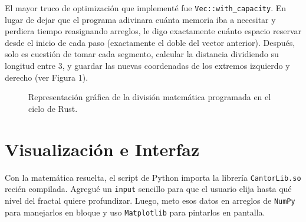 \documentclass[12pt,letterpaper]{article}
\begin{document}
El mayor truco de optimización que implementé fue \texttt{Vec::with\_capacity}. En lugar de dejar que el programa adivinara cuánta memoria iba a necesitar y perdiera tiempo reasignando arreglos, le digo exactamente cuánto espacio reservar desde el inicio de cada paso (exactamente el doble del vector anterior). Después, solo es cuestión de tomar cada segmento, calcular la distancia dividiendo su longitud entre 3, y guardar las nuevas coordenadas de los extremos izquierdo y derecho (ver Figura 1).

\begin{figure}[htpb]
    \centering
    \vspace{0.3cm}
    \caption{Representación gráfica de la división matemática programada en el ciclo de Rust.}
\end{figure}

\section*{Visualización e Interfaz}

Con la matemática resuelta, el script de Python importa la librería \texttt{CantorLib.so} recién compilada. Agregué un \texttt{input} sencillo para que el usuario elija hasta qué nivel del fractal quiere profundizar. Luego, meto esos datos en arreglos de \texttt{NumPy} para manejarlos en bloque y uso \texttt{Matplotlib} para pintarlos en pantalla.
\end{document}
